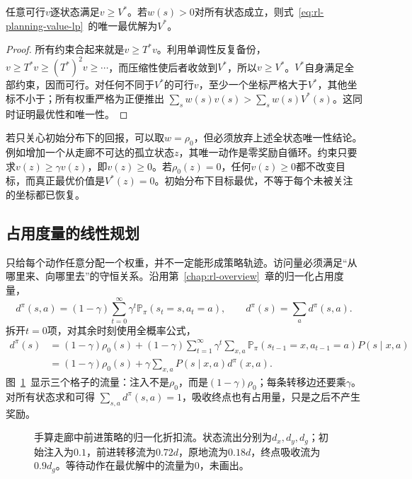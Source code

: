 \begin{theorem}[价值线性规划的解]
 \label{thm:rl-planning-value-lp}
 任意可行$v$逐状态满足$v\geq V^*$。若$w(s)>0$对所有状态成立，则式~\eqref{eq:rl-planning-value-lp}~的唯一最优解为$V^*$。
\end{theorem}
\begin{proof}
 所有约束合起来就是$v\geq T^*v$。利用单调性反复备份，
 $v\geq T^*v\geq(T^*)^2v\geq\cdots$，而压缩性使后者收敛到$V^*$，所以$v\geq V^*$。$V^*$自身满足全部约束，因而可行。对任何不同于$V^*$的可行$v$，至少一个坐标严格大于$V^*$，其他坐标不小于；所有权重严格为正便推出
 $\sum_s w(s)v(s)>\sum_s w(s)V^*(s)$。这同时证明最优性和唯一性。
\end{proof}

若只关心初始分布下的回报，可以取$w=\rho_0$，但必须放弃上述全状态唯一性结论。例如增加一个从走廊不可达的孤立状态$z$，其唯一动作是零奖励自循环。约束只要求$v(z)\geq\gamma v(z)$，即$v(z)\geq0$。若$\rho_0(z)=0$，任何$v(z)\geq0$都不改变目标，而真正最优价值是$V^*(z)=0$。初始分布下目标最优，不等于每个未被关注的坐标都已恢复。

\subsection{占用度量的线性规划}
\label{sec:rl-planning-occupancy-lp}

只给每个动作任意分配一个权重，并不一定能形成策略轨迹。访问量必须满足“从哪里来、向哪里去”的守恒关系。沿用第~\ref{chap:rl-overview}~章的归一化占用度量，
\[
 d^\pi(s,a)=(1-\gamma)\sum_{t=0}^{\infty}
 \gamma^t\mathbb P_\pi(s_t=s,a_t=a),\qquad
 d^\pi(s)=\sum_a d^\pi(s,a).
\]
拆开$t=0$项，对其余时刻使用全概率公式，
\begin{equation}
 \begin{aligned}
 d^\pi(s)
 &=(1-\gamma)\rho_0(s)
   +(1-\gamma)\sum_{t=1}^{\infty}\gamma^t
     \sum_{x,a}\mathbb P_\pi(s_{t-1}=x,a_{t-1}=a)P(s\mid x,a)\\
 &=(1-\gamma)\rho_0(s)+\gamma\sum_{x,a}P(s\mid x,a)d^\pi(x,a).
 \end{aligned}
 \label{eq:rl-planning-flow}
\end{equation}
图~\ref{fig:rl-planning-occupancy-flow}~显示三个格子的流量：注入不是$\rho_0$，而是$(1-\gamma)\rho_0$；每条转移边还要乘$\gamma$。对所有状态求和可得
$\sum_{s,a}d^\pi(s,a)=1$，吸收终点也有占用量，只是之后不产生奖励。

\begin{figure}[htbp]
 \centering
 
 \caption{手算走廊中前进策略的归一化折扣流。状态流出分别为$d_x,d_y,d_g$；初始注入为$0.1$，前进转移流为$0.72d$，原地流为$0.18d$，终点吸收流为$0.9d_g$。等待动作在最优解中的流量为0，未画出。}
 \label{fig:rl-planning-occupancy-flow}
\end{figure}

